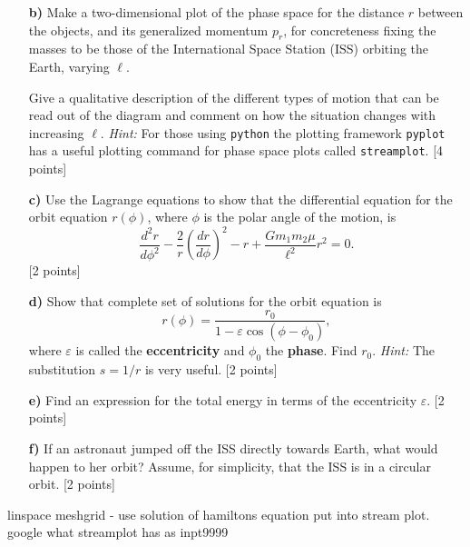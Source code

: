 \documentclass[11pt,a4paper]{report}
\newcounter{excount}[chapter]
\newenvironment{exercise}[1][]{\addtocounter{excount}{1} \noindent {\bf Question
    \arabic{excount} \ \ #1}\hspace{2mm}}{\vspace{4mm}}
\begin{document}
\begin{exercise}{\bf Orbital motion\\}
\begin{itemize}
 \item[{\bf b)}] Make a two-dimensional plot of the phase space for the distance $r$ between the objects, and its generalized momentum $p_r$, for concreteness fixing the masses to be those of the International Space Station (ISS) orbiting the Earth, varying $\ell$.

Give a qualitative description of the different types of motion that can be read out of the diagram and comment on how the situation changes with increasing $\ell$. {\it Hint:} For those using {\tt python} the plotting framework {\tt pyplot} has a useful plotting command for phase space plots called {\tt streamplot}.  [4 points]
\item[{\bf c)}] Use the Lagrange equations to show that the differential equation for the orbit equation $r(\phi)$, where $\phi$ is the polar angle of the motion, is
\begin{equation}
\frac{d^2r}{d\phi^2}-\frac{2}{ r}\left(\frac{dr}{d\phi}\right)^2-r+\frac{Gm_1m_2\mu }{\ell^2}r^2=0.
\end{equation}
[2 points]
\item[{\bf d)}] Show that complete set of solutions for the orbit equation  is
\begin{equation}
r(\phi)= \frac{r_0}{1-\varepsilon \cos(\phi-\phi_0)},
\end{equation}
where $\varepsilon$ is called the {\bf eccentricity} and $\phi_0$ the {\bf phase}. Find $r_0$.
{\it Hint:} The substitution $s=1/r$ is very useful. [2 points]
\item[{\bf e)}] Find an expression for the total energy in terms of the eccentricity $\varepsilon$. [2 points]
\item[{\bf f)}] If an astronaut jumped off the ISS directly towards Earth, what would happen to her orbit? Assume, for simplicity, that the ISS is in a circular orbit. [2 points]
\end{itemize}
\end{exercise}


linspace meshgrid - use solution of hamiltons equation put into stream plot. google what streamplot has as inpt9999
\end{document}
